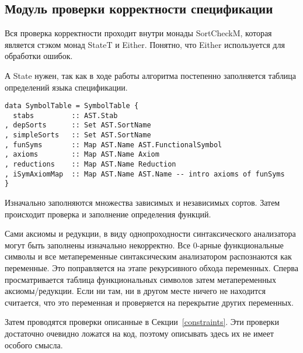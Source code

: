 \subsection{Модуль проверки корректности спецификации}\label{sortcheck}
Вся проверка корректности проходит внутри монады SortCheckM, которая является стэком монад StateT и Either. Понятно, что Either используется для обработки ошибок.

А State нужен, так как в ходе работы алгоритма постепенно заполняется таблица определений языка спецификации.

\begin{lstlisting}[caption={Структура заполняемая модулем проверки спецификации},captionpos=b,frame=single, label={SymTab}]
data SymbolTable = SymbolTable {
  stabs         :: AST.Stab
, depSorts      :: Set AST.SortName
, simpleSorts   :: Set AST.SortName
, funSyms       :: Map AST.Name AST.FunctionalSymbol
, axioms        :: Map AST.Name Axiom
, reductions    :: Map AST.Name Reduction
, iSymAxiomMap  :: Map AST.Name AST.Name -- intro axioms of funSyms
}
\end{lstlisting}

Изначально заполняются множества зависимых и независимых сортов. Затем происходит проверка и заполнение определения функций.

Сами аксиомы и редукции, в виду однопроходности синтаксического анализатора могут быть заполнены изначально некорректно. Все 0-арные функциональные символы и все метапеременные синтаксическим анализатором распознаются как переменные. Это поправляется на этапе рекурсивного обхода переменных. Сперва просматривается таблица функциональных символов затем метапеременных аксиомы/редукции. Если ни там, ни в другом месте ничего не находится считается, что это переменная и проверяется на перекрытие других переменных.

Затем проводятся проверки описанные в Секции~\ref{constraints}. Эти проверки достаточно очевидно ложатся на код, поэтому описывать здесь их не имеет особого смысла.




















